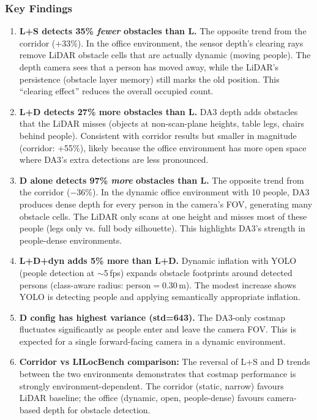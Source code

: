 \documentclass[11pt,a4paper]{article}
\begin{document}
\subsubsection{Key Findings}

\begin{enumerate}[nosep]
  \item \textbf{L+S detects 35\% \emph{fewer} obstacles than L.}
    The opposite trend from the corridor ($+$33\%).  In the office
    environment, the sensor depth's clearing rays remove LiDAR obstacle
    cells that are actually dynamic (moving people).  The depth camera
    sees that a person has moved away, while the LiDAR's persistence
    (obstacle layer memory) still marks the old position.  This
    ``clearing effect'' reduces the overall occupied count.

  \item \textbf{L+D detects 27\% more obstacles than L.}
    DA3 depth adds obstacles that the LiDAR misses (objects at non-scan-plane
    heights, table legs, chairs behind people). Consistent with corridor
    results but smaller in magnitude (corridor: $+$55\%), likely because
    the office environment has more open space where DA3's extra detections
    are less pronounced.

  \item \textbf{D alone detects 97\% \emph{more} obstacles than L.}
    The opposite trend from the corridor ($-$36\%).  In the dynamic office
    environment with 10 people, DA3 produces dense depth for every person
    in the camera's FOV, generating many obstacle cells.  The LiDAR only
    scans at one height and misses most of these people (legs only vs.
    full body silhouette).  This highlights DA3's strength in
    people-dense environments.

  \item \textbf{L+D+dyn adds 5\% more than L+D.}
    Dynamic inflation with YOLO (people detection at $\sim$5\,fps)
    expands obstacle footprints around detected persons (class-aware
    radius: person$=$0.30\,m).  The modest increase shows YOLO is
    detecting people and applying semantically appropriate inflation.

  \item \textbf{D config has highest variance (std=643).}
    The DA3-only costmap fluctuates significantly as people enter and
    leave the camera FOV.  This is expected for a single forward-facing
    camera in a dynamic environment.

  \item \textbf{Corridor vs LILocBench comparison:}
    The reversal of L+S and D trends between the two environments
    demonstrates that costmap performance is strongly
    environment-dependent. The corridor (static, narrow) favours LiDAR
    baseline; the office (dynamic, open, people-dense) favours
    camera-based depth for obstacle detection.
\end{enumerate}
\end{document}
